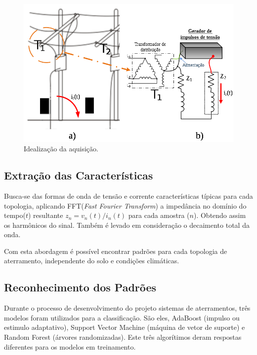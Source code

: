 \documentclass[a4paper, 10pt]{article}
\begin{document}
\begin{figure}[!h]
    \caption{\label{fig_ideia_aquisicao} Idealização da aquisição.}
	    \begin{center}
            \includegraphics[scale=0.4]{../fotos/sinal/trafo.png}
	    \end{center}
\end{figure}

\subsection{Extração das Características}

Busca-se das formas de onda de tensão e corrente características típicas para 
cada topologia, aplicando FFT(\textit{Fast Fourier Transform}) a impedância 
no domínio do tempo($t$) resultante $z_n=v_n(t)/i_n(t)$ para cada amostra ($n$).
Obtendo assim os harmônicos do sinal. Também é levado em consideração
o decaimento total da onda.


Com esta abordagem é possível encontrar padrões para cada topologia de aterramento, 
independente do solo e condições climáticas.

\subsection{Reconhecimento dos Padrões}

Durante o processo de desenvolvimento do projeto sistemas de 
aterramentos, três modelos foram utilizados para a classificação.
São eles, AdaBoost (impulso ou estimulo adaptativo), Support 
Vector Machine (máquina de vetor de suporte) e Random Forest
(árvores randomizadas). Este três algorítimos deram respostas
diferentes para os modelos em treinamento.
\end{document}
